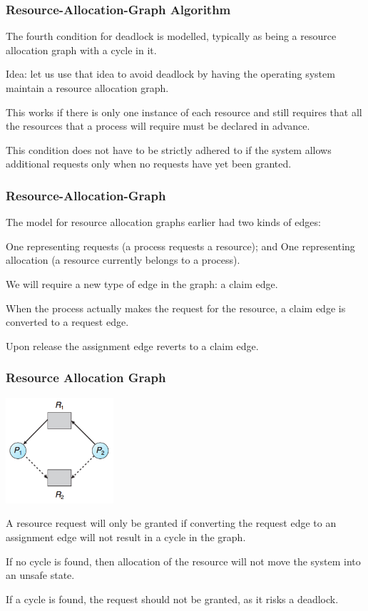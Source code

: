 \begin{frame}
	\frametitle{Resource-Allocation-Graph Algorithm}

	The fourth condition for deadlock is modelled, typically as being a resource allocation graph with a cycle in it.

	Idea: let us use that idea to avoid deadlock by having the operating system maintain a resource allocation graph.

	This works if there is only one instance of each resource and still requires that all the resources that a process will require must be declared in advance.

	This condition does not have to be strictly adhered to if the system allows additional requests only when no requests have yet been granted.

\end{frame}

\begin{frame}
	\frametitle{Resource-Allocation-Graph}

	The model for resource allocation graphs earlier had two kinds of edges:

	One representing requests (a process requests a resource); and
	One representing allocation (a resource currently belongs to a process).

	We will require a new type of edge in the graph: a \alert{claim} edge.

	When the process actually makes the request for the resource, a claim edge is converted to a request edge.

	Upon release the assignment edge reverts to a claim edge.
\end{frame}

\begin{frame}
	\frametitle{Resource Allocation Graph}

	\begin{center}
		\includegraphics[width=0.3\textwidth]{images/resource-allocation-graph-claim.png}
	\end{center}

	A resource request will only be granted if converting the request edge to an assignment edge will not result in a cycle in the graph.

	If no cycle is found, then allocation of the resource will not move the system into an unsafe state.

	If a cycle is found, the request should not be granted, as it risks a deadlock.

\end{frame}


